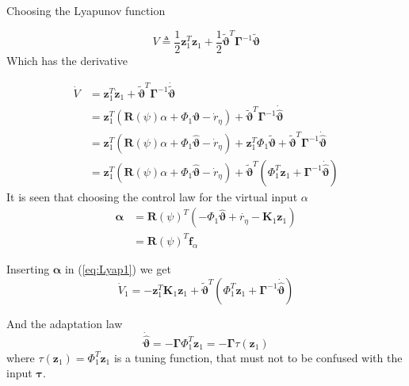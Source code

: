 \documentclass[12pt,a4]{article}
\begin{document}
Choosing the Lyapunov function

\begin{equation}
	V \triangleq \frac{1}{2}\bm{z}_1^T\bm{z}_1 + \frac{1}{2}\bm{\tilde{\vartheta}}^T\bm{\Gamma}^{-1}\bm{\tilde{\vartheta}}
\end{equation}
Which has the derivative

\begin{align}
	\dot{V} & = \bm{z}_1^T\dot{\bm{z}}_1
	+ \bm{\tilde{\vartheta}} ^T\bm{\Gamma}^{-1}\bm{\dot{\tilde{\vartheta}}}                                        \\
	        & = \bm{z}_1^T\left( \bm{R}(\psi)\alpha + \Phi_1\bm{\vartheta} - \dot{r}_{\eta} \right)
	+ \bm{\tilde{\vartheta}} ^T\bm{\Gamma}^{-1}\bm{\dot{\hat{\vartheta}}}                                          \\
	        & = \bm{z}_1^T\left( \bm{R}(\psi)\alpha + \Phi_1\bm{\hat{\vartheta}} - \dot{r}_{\eta} \right)
	+ \bm{z}_1^T\Phi_1\bm{\tilde{\vartheta}} + \bm{\tilde{\vartheta}} ^T\bm{\Gamma}^{-1}\bm{\dot{\hat{\vartheta}}} \\
	\label{eq:Lyap1}
	        & = \bm{z}_1^T\left( \bm{R}(\psi)\alpha + \Phi_1\bm{\hat{\vartheta}} - \dot{r}_{\eta} \right)
	+ \bm{\tilde{\vartheta}}^T \left(  \Phi_1^T\bm{z}_1 + \bm{\Gamma}^{-1}\bm{\dot{\hat{\vartheta}}} \right)
\end{align}
It is seen that choosing the control law for the virtual input $\alpha$
\begin{align}
	\bm{\alpha} & = \bm{R}(\psi)^T  \left( -\Phi_1 \bm{\hat{\vartheta}}    +\dot{r_{\eta}} -\bm{K}_1\bm{z}_1 \right) \\
	            & = \bm{R}(\psi)^T \bm{f}_\alpha
\end{align}

Inserting $\bm{\alpha}$ in (\ref{eq:Lyap1}) we get
\begin{equation}
	\dot{V}_1 = -\bm{z}_1^T \bm{K}_1 \bm{z}_1
	+ \bm{\tilde{\vartheta}}^T \left(  \Phi_1^T\bm{z}_1 + \bm{\Gamma}^{-1}\bm{\dot{\hat{\vartheta}}} \right)
\end{equation}

And the adaptation law
\begin{equation}
	\bm{\dot{\hat{\vartheta}}} = - \bm{\Gamma} \Phi_1^T \bm{z}_1 = - \bm{\Gamma} \tau(\bm{z}_1)
\end{equation}
where $\tau(\bm{z}_1) = \Phi_1^T \bm{z}_1$ is a tuning function, that must not to be confused with the input $\bm{\tau}$.
\end{document}
